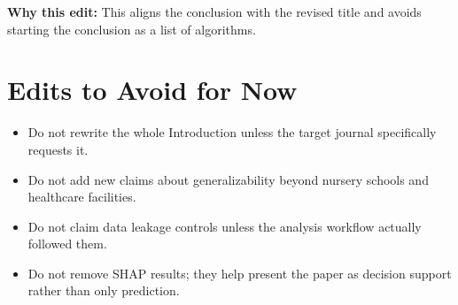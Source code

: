 \documentclass[11pt]{article}
\newcommand{\why}[1]{\textbf{Why this edit:} #1}
\begin{document}
\why{This aligns the conclusion with the revised title and avoids starting the conclusion as a list of algorithms.}

\section*{Edits to Avoid for Now}
\begin{itemize}[leftmargin=*]
\item Do not rewrite the whole Introduction unless the target journal specifically requests it.
\item Do not add new claims about generalizability beyond nursery schools and healthcare facilities.
\item Do not claim data leakage controls unless the analysis workflow actually followed them.
\item Do not remove SHAP results; they help present the paper as decision support rather than only prediction.
\end{itemize}
\end{document}
